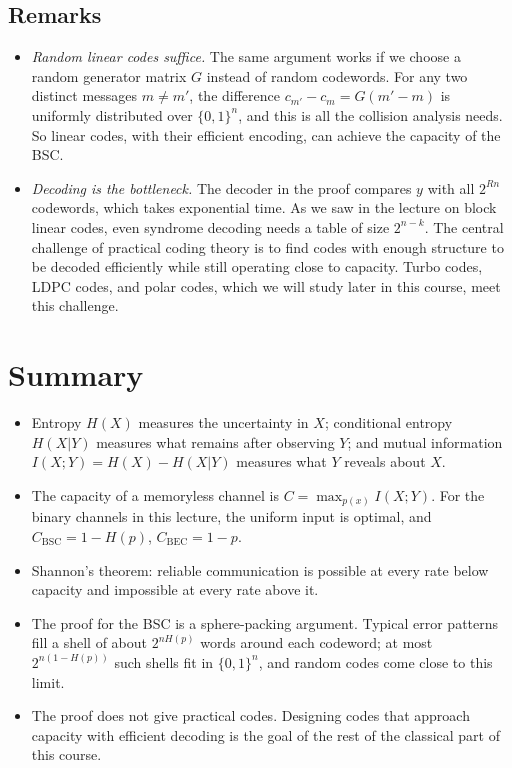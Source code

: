 \subsection{Remarks}
\begin{itemize}
    \item \emph{Random linear codes suffice.} The same argument works if we choose a random generator matrix \(G\) instead of random codewords. For any two distinct messages \(m \neq m'\), the difference \(c_{m'} - c_m = G(m' - m)\) is uniformly distributed over \(\{0,1\}^n\), and this is all the collision analysis needs. So linear codes, with their efficient encoding, can achieve the capacity of the BSC.
    \item \emph{Decoding is the bottleneck.} The decoder in the proof compares \(y\) with all \(2^{Rn}\) codewords, which takes exponential time. As we saw in the lecture on block linear codes, even syndrome decoding needs a table of size \(2^{n-k}\). The central challenge of practical coding theory is to find codes with enough structure to be decoded efficiently while still operating close to capacity. Turbo codes, LDPC codes, and polar codes, which we will study later in this course, meet this challenge.
\end{itemize}

\section{Summary}
\begin{itemize}
    \item Entropy \(H(X)\) measures the uncertainty in \(X\); conditional entropy \(H(X|Y)\) measures what remains after observing \(Y\); and mutual information \(I(X;Y) = H(X) - H(X|Y)\) measures what \(Y\) reveals about \(X\).
    \item The capacity of a memoryless channel is \(C = \max_{p(x)} I(X;Y)\). For the binary channels in this lecture, the uniform input is optimal, and \(C_{\mathrm{BSC}} = 1 - H(p)\), \(C_{\mathrm{BEC}} = 1 - p\).
    \item Shannon's theorem: reliable communication is possible at every rate below capacity and impossible at every rate above it.
    \item The proof for the BSC is a sphere-packing argument. Typical error patterns fill a shell of about \(2^{nH(p)}\) words around each codeword; at most \(2^{n(1-H(p))}\) such shells fit in \(\{0,1\}^n\), and random codes come close to this limit.
    \item The proof does not give practical codes. Designing codes that approach capacity with efficient decoding is the goal of the rest of the classical part of this course.
\end{itemize}
